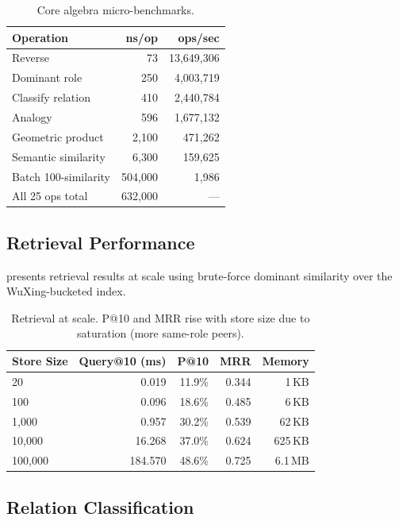 \documentclass[11pt,a4paper]{article}
\begin{document}
\begin{table}[ht]
\centering
\caption{Core algebra micro-benchmarks.}
\label{tab:algebra}
\begin{tabular}{lrr}
\toprule
\textbf{Operation} & \textbf{ns/op} & \textbf{ops/sec} \\
\midrule
Reverse           &   73   & 13,649,306 \\
Dominant role     &  250   &  4,003,719 \\
Classify relation &  410   &  2,440,784 \\
Analogy           &  596   &  1,677,132 \\
Geometric product &  2,100 &    471,262 \\
Semantic similarity & 6,300 &   159,625 \\
Batch 100-similarity & 504,000 &  1,986 \\
\midrule
All 25 ops total  & 632,000 & --- \\
\bottomrule
\end{tabular}
\end{table}

\subsection{Retrieval Performance}

 presents retrieval results at scale using brute-force
dominant similarity over the WuXing-bucketed index.

\begin{table}[ht]
\centering
\caption{Retrieval at scale. P@10 and MRR rise with store size due to
saturation (more same-role peers).}
\label{tab:retrieval}
\begin{tabular}{lrrrr}
\toprule
\textbf{Store Size} & \textbf{Query@10 (ms)} & \textbf{P@10} & \textbf{MRR} & \textbf{Memory} \\
\midrule
       20  &   0.019   & 11.9\%  & 0.344 &   1\,KB \\
      100  &   0.096   & 18.6\%  & 0.485 &   6\,KB \\
    1,000  &   0.957   & 30.2\%  & 0.539 &  62\,KB \\
   10,000  &  16.268   & 37.0\%  & 0.624 & 625\,KB \\
  100,000  & 184.570   & 48.6\%  & 0.725 & 6.1\,MB \\
\bottomrule
\end{tabular}
\end{table}

\subsection{Relation Classification}
\end{document}
